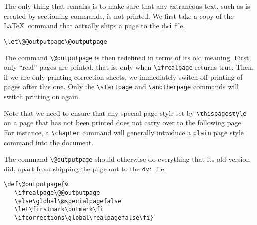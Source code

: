 The only thing that remains is to make sure that any extraneous text, such
as is created by sectioning commands, is not printed. We first take a copy
of the \LaTeX\ command that actually ships a page to the \verb"dvi" file.
\begin{verbatim}
\let\@@outputpage\@outputpage
\end{verbatim}
The command \verb"\@outputpage" is then redefined in terms of its old
meaning. First, only ``real'' pages are printed, that is, only when
\verb"\ifrealpage" returns true. Then, if we are only printing correction
sheets, we immediately switch off printing of pages after this one.
Only the \verb"\startpage" and \verb"\anotherpage" commands will switch
printing on again.

Note that we need to ensure that any special page style
set by \verb"\thispagestyle" on a page that has not been printed
does not carry over to the following page.
For instance, a \verb"\chapter" command will generally introduce a
\verb"plain" page style command into the document.

The command \verb"\@outputpage" should otherwise do everything that its old
version did, apart from shipping the page out to the \verb"dvi" file.
\begin{verbatim}
\def\@outputpage{%
   \ifrealpage\@@outputpage
   \else\global\@specialpagefalse
   \let\firstmark\botmark\fi
   \ifcorrections\global\realpagefalse\fi}
\end{verbatim}
\makesignature




